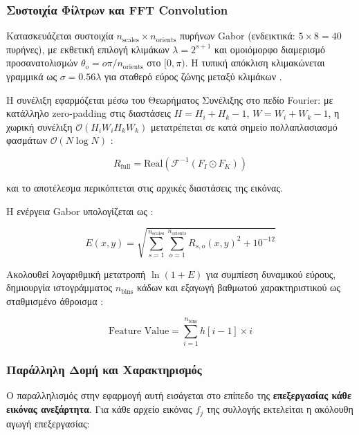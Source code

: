 \subsubsection{Συστοιχία Φίλτρων και FFT Convolution}

Κατασκευάζεται συστοιχία $n_\mathrm{scales} \times n_\mathrm{orients}$ πυρήνων Gabor (ενδεικτικά: $5 \times 8 = 40$ πυρήνες), με εκθετική επιλογή κλιμάκων $\lambda = 2^{s+1}$ και ομοιόμορφο διαμερισμό προσανατολισμών $\theta_o = o\pi/n_\mathrm{orients}$ στο $[0,\pi)$. Η τυπική απόκλιση κλιμακώνεται γραμμικά ως $\sigma = 0.56\lambda$ για σταθερό εύρος ζώνης μεταξύ κλιμάκων \cite{GaborMDPI,appcode}.

Η συνέλιξη εφαρμόζεται μέσω του Θεωρήματος Συνέλιξης στο πεδίο Fourier: με κατάλληλο zero-padding στις διαστάσεις $H = H_i + H_k - 1$, $W = W_i + W_k - 1$, η χωρική συνέλιξη $\mathcal{O}(H_i W_i H_k W_k)$ μετατρέπεται σε κατά σημείο πολλαπλασιασμό φασμάτων $\mathcal{O}(N\log N)$ \cite{appcode, WikiGabor}:

\begin{equation}
  R_\mathrm{full} = \mathrm{Real}\!\left(\mathcal{F}^{-1}(F_I \odot F_K)\right)
\end{equation}

και το αποτέλεσμα περικόπτεται στις αρχικές διαστάσεις της εικόνας.

Η ενέργεια Gabor υπολογίζεται ως \cite{appcode}:

\begin{equation}
  E(x,y) = \sqrt{\sum_{s=1}^{n_\mathrm{scales}}
                  \sum_{o=1}^{n_\mathrm{orients}}
                  R_{s,o}(x,y)^2 + 10^{-12}}
\end{equation}

Ακολουθεί λογαριθμική μετατροπή $\ln(1+E)$ για συμπίεση δυναμικού εύρους, δημιουργία ιστογράμματος $n_\mathrm{bins}$ κάδων και εξαγωγή βαθμωτού χαρακτηριστικού ως σταθμισμένο άθροισμα \cite{appcode}:

\begin{equation}
  \text{Feature Value} = \sum_{i=1}^{n_\mathrm{bins}} h[i-1] \times i
\end{equation}

\subsubsection{Παράλληλη Δομή και Χαρακτηρισμός}

Ο παραλληλισμός στην εφαρμογή αυτή εισάγεται στο επίπεδο της \textbf{επεξεργασίας κάθε εικόνας ανεξάρτητα}. Για κάθε αρχείο εικόνας $f_j$ της συλλογής εκτελείται η ακόλουθη αγωγή επεξεργασίας:

